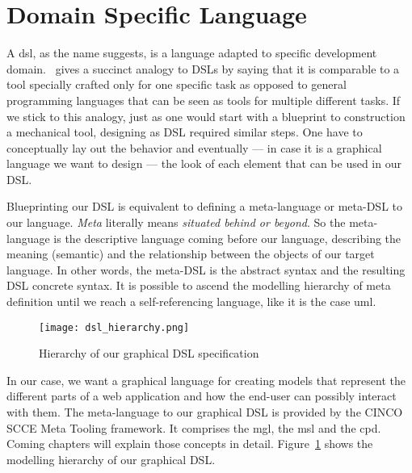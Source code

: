 \section{Domain Specific Language}

A \acrfull{dsl}, as the name suggests, is a language adapted to specific development domain.~\cite{Naujokat2018} gives a succinct analogy to DSLs by saying that it is comparable to a tool specially crafted only for one specific task as opposed to general programming languages that can be seen as tools for multiple different tasks. If we stick to this analogy, just as one would start with a blueprint to construction a mechanical tool, designing as DSL required similar steps. One have to conceptually lay out the behavior and eventually --- in case it is a graphical language we want to design --- the look of each element that can be used in our DSL\@. 

Blueprinting our DSL is equivalent to defining a meta-language or meta-DSL to our language. \textit{Meta} literally means \textit{situated behind or beyond}. So the meta-language is the descriptive language coming before our language, describing the meaning (semantic) and the relationship between the objects of our target language. In other words, the meta-DSL is the abstract syntax and the resulting DSL concrete syntax. It is possible to ascend the modelling hierarchy of meta definition until we reach a self-referencing language, like it is the case \acrfull{uml}.

\begin{figure}[h]
    \texttt{[image: dsl\_hierarchy.png]}
    \caption{Hierarchy of our graphical DSL specification}\label{fig:modelling-hierachy}
\end{figure}

In our case, we want a graphical language for creating models that represent the different parts of a web application and how the end-user can possibly interact with them. The meta-language to our graphical DSL is provided by the CINCO SCCE Meta Tooling framework. It comprises the \acrfull{mgl}, the \acrfull{msl} and the \acrfull{cpd}. Coming chapters will explain those concepts in detail. Figure~\ref{fig:modelling-hierachy} shows the modelling hierarchy of our graphical DSL\@.